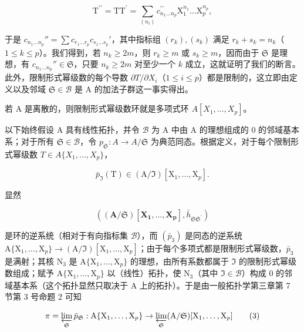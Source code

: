 \[
\mathrm{T} ^ {\prime \prime} = \mathrm{TT} ^ {\prime} = \sum_ {(n _ {i})} c _ {n _ {1} \dots n _ {p}} ^ {\prime \prime} \mathrm{X} _ {1} ^ {n _ {1}} \dots \mathrm{X} _ {p} ^ {n _ {p}},
\]

于是 \(c_{n_1 \ldots n_p}'' = \sum c_{r_1 \ldots r_p} c_{s_1 \ldots s_p}'\)，其中指标组 \((r_k), (s_k)\) 满足 \(r_k + s_k = n_k\)（\(1 \leqslant k \leqslant p\)）。我们得到，若 \(n_k \geqslant 2m\)，则 \(r_k \geqslant m\) 或 \(s_k \geqslant m\)，因而由于 \(\mathfrak{S}\) 是理想，有 \(c_{n_1 \ldots n_p}'' \in \mathfrak{S}\)，只要 \(n_k \geqslant 2m\) 对至少一个 \(k\) 成立，这就证明了我们的断言。此外，限制形式幂级数的每个导数 \(\partial T / \partial X_i\)（\(1 \leqslant i \leqslant p\)）都是限制的，这立即由定义以及邻域 \(\mathfrak{S} \in \mathcal{B}\) 是 A 的加法子群这一事实得出。

若 A 是离散的，则限制形式幂级数环就是多项式环 \(A[X_{1},\ldots,X_{p}]\)。

以下始终假设 A 具有线性拓扑，并令 \(\mathcal{B}\) 为 A 中由 A 的理想组成的 0 的邻域基本系；对于所有 \(\mathfrak{S} \in \mathcal{B}\)，令 \(p_{\mathfrak{S}}: A \to A/\mathfrak{S}\) 为典范同态。根据定义，对于每个限制形式幂级数 \(T \in A\{X_{1}, \ldots, X_{p}\}\)，

\[
\bar {p} _ {\Im} (\mathrm{T}) \in (\mathrm{A} / \Im) [ \mathrm{X} _ {1}, \dots , \mathrm{X} _ {p} ].
\]

显然

\[
((\mathbf {A} / \mathfrak {S}) [ \mathbf {X _ {1}}, \dots , \mathbf {X _ {p}} ], \bar {h} _ {\mathfrak {S} \mathfrak {S} ^ {\prime}})
\]

是环的逆系统（相对于有向指标集 \(\mathcal{B}\)），而 \((\bar{p}_{3})\) 是同态的逆系统 \(\mathrm{A}\{\mathrm{X}_1,\dots ,\mathrm{X}_p\} \to (\mathrm{A} / \Im)[\mathrm{X}_1,\dots ,\mathrm{X}_p]\)；由于每个多项式都是限制形式幂级数，\(\bar{p}_{3}\) 是满射；其核 \(\mathrm{N}_{3}\) 是 \(\mathrm{A}\{\mathrm{X}_1,\dots ,\mathrm{X}_p\}\) 的理想，由所有系数都属于 \(\Im\) 的限制形式幂级数组成；赋予 \(\mathrm{A}\{\mathrm{X}_1,\dots ,\mathrm{X}_p\}\) 以（线性）拓扑，使 \(\mathrm{N}_{3}\)（其中 \(\Im \in \mathcal{B}\)）构成 0 的邻域基本系（这个拓扑显然只取决于 A 上的拓扑）。于是由一般拓扑学第三章第 7 节第 3 号命题 2 可知

\[
\pi = \varprojlim_ {\mathfrak {S}} \bar {p} _ {\mathfrak {S}}: \mathrm{A} \{\mathrm{X} _ {1}, \dots , \mathrm{X} _ {p} \} \rightarrow \varprojlim_ {\mathfrak {S}} (\mathrm{A} / \mathfrak {S}) [ \mathrm{X} _ {1}, \dots , \mathrm{X} _ {p} ]\tag{3}
\]

